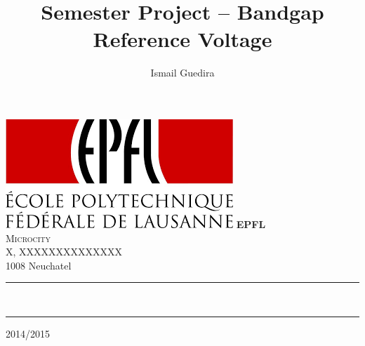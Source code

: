 \documentclass[11pt,a4paper]{report}
\title{Semester Project -- Bandgap Reference Voltage}
\author{Ismail Guedira}
\begin{document}

 \makeatletter
   \begin{titlepage}
  \centering
    {
    \includegraphics[height=0.09\textheight]{logo_epfl}
    \hfill \Large \textbf{EPFL}\\
    \hfill \large \textsc{Microcity}\\
    \hfill  X, XXXXXXXXXXXXXX \\
	  \hfill  1008 Neuchatel\\
}
	\hspace{3em}
% 
% 
 \vfill


 
     \hrule
     \vspace{2em}
     \Large \textbf{\@title} \\
     \vspace{2em}
     \hrule
    
        
    
% 
% 
% 
     \vfill
% 
      {\Large \textsc{2014/2015}  \hfill \Large \textsc{\@date}} \\
% 
% 
  \end{titlepage}
\makeatother
\end{document}
